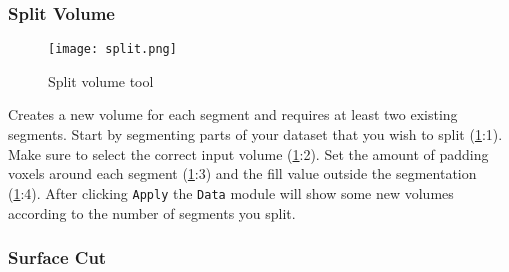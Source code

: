 \pagebreak
\subsubsection{Split Volume}
\begin{figure}[h]
	\begin{subfigure}{0.2\textwidth}
		
	\end{subfigure}
\end{figure}
\begin{figure}[h!]
	\centerline{
		\texttt{[image: split.png]}}
	\caption{Split volume tool}\label{fig:split}
\end{figure}
\noindent
Creates a new volume for each segment and requires at least two existing segments.
Start by segmenting parts of your dataset that you wish to split (\cref{fig:split}:1).
Make sure to select the correct input volume (\cref{fig:split}:2).
Set the amount of padding voxels around each segment (\cref{fig:split}:3) and the fill value outside the segmentation (\cref{fig:split}:4).
After clicking \texttt{Apply} the \texttt{Data} module will show some new volumes according to the number of segments you split.

\pagebreak
\subsubsection{Surface Cut}
\begin{figure}[h]
	\begin{subfigure}{0.2\textwidth}
		
	\end{subfigure}
	\begin{subfigure}{0.2\textwidth}
		
	\end{subfigure}
	\begin{subfigure}{0.2\textwidth}
		
	\end{subfigure}
\end{figure}

